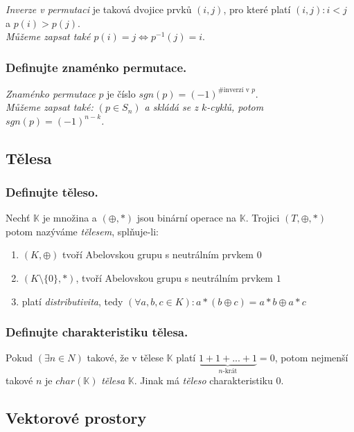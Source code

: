 \documentclass[10pt,a4paper]{article}
\begin{document}
\textit{Inverze v permutaci} je taková dvojice prvků $(i, j)$, pro které platí $(i, j): i < j$ a $p(i) > p(j)$.\\
\textit{Můžeme zapsat také $p(i) = j \iff p^{-1}(j) = i$}.

\subsubsection{Definujte znaménko permutace.}

\textit{Znaménko permutace} $p$ je číslo $sgn(p) = (-1)^{\# \text{inverzí v } p}$.\\
\textit{Můžeme zapsat také: $(p \in S_n)$ a skládá se z $k$-cyklů, potom $sgn(p) = (-1)^{n-k}$.}

\subsection{Tělesa}
\subsubsection{Definujte těleso.}

Nechť $\mathbb{K}$ je množina a $(\oplus, *)$ jsou binární operace na $\mathbb{K}$. Trojici $(T, \oplus, *)$ potom nazýváme \textit{tělesem}, splňuje-li:

\begin{enumerate}[label=(\roman*)]
\item $(K, \oplus)$ tvoří Abelovskou grupu s neutrálním prvkem $0$
\item $(K \setminus \{0\}, *)$, tvoří Abelovskou grupu s neutrálním prvkem $1$
\item platí \textit{distributivita}, tedy
$(\forall a,b,c \in K): a * (b \oplus c) = a * b \oplus a * c$ 

\end{enumerate}

\subsubsection{Definujte charakteristiku tělesa.}

Pokud $(\exists n \in N)$ takové, že v tělese $\mathbb{K}$ platí $\underbrace{1+1+...+ 1}_{n\text{-krát}} = 0$, potom nejmenší takové $n$ je $char(\mathbb{K})$ \textit{tělesa} $\mathbb{K}$. Jinak má \textit{těleso} charakteristiku $0$.

 \subsection{Vektorové prostory}
\end{document}
